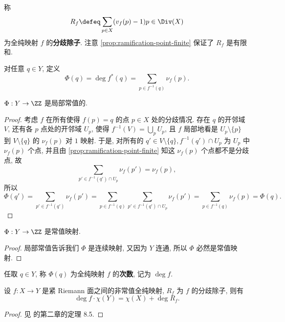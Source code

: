 \begin{exmp}[分歧除子]
\label{exmp:ramification-divisor}
称
\begin{equation}
\label{eq:ramification-divisor}
R_f \defeq \sum_{p \in X}(v_f(p) - 1)p \in \Div(X)
\end{equation}
为全纯映射 $f$ 的\textbf{分歧除子}.
注意 \cref{prop:ramification-point-finite} 保证了 $R_f$ 是有限和.
\end{exmp}

对任意 $q \in Y$, 定义
\[\Phi(q) = \deg f^*(q) = \sum_{p \in f^{-1}(q)}\nu_f(p).\]

\begin{prop}
$\Phi: Y \to \ZZ$ 是局部常值的.
\end{prop}

\begin{proof}
考虑 $f$ 在所有使得 $f(p) = q$ 的点 $p \in X$ 处的分歧情况.
存在 $q$ 的开邻域 $V$, 还有各 $p$ 点处的开邻域 $U_p$,
使得 $f^{-1}(V) = \bigcup_p U_p$,
且 $f$ 局部地看是 $U_p\setminus \{p\}$ 到 $V\setminus \{q\}$ 的 $\nu_f(p)$ 对 $1$ 映射.
于是, 对所有的 $q' \in V\setminus \{q\}, f^{-1}(q') \cap U_p$ 为 $U_p$ 中 $\nu_f(p)$ 个点,
并且由 \cref{prop:ramification-point-finite} 知这 $\nu_f(p)$ 个点都不是分歧点,
故
\[\sum_{p' \in f^{-1}(q') \cap U_p} \nu_f(p') = \nu_f(p),\]
所以
\[\Phi(q') = \sum_{p' \in f^{-1}(q')}\nu_f(p') = \sum_{p \in f^{-1}(q)}\sum_{p' \in f^{-1}(q') \cap U_p} \nu_f(p') = \sum_{p \in f^{-1}(q)}\nu_f(p) = \Phi(q).\]
\end{proof}

\begin{cor}
$\Phi: Y \to \ZZ$ 是常值映射.
\end{cor}

\begin{proof}
局部常值告诉我们 $\Phi$ 是连续映射,
又因为 $Y$ 连通, 所以 $\Phi$ 必然是常值映射.
\end{proof}

\begin{defin}[全纯映射的次数]
\label{defin:mapping-degree}
任取 $q\in Y$, 称 $\Phi(q)$ 为全纯映射 $f$ 的\textbf{次数}, 记为 $\deg f$.
\end{defin}

\begin{prop}
\label{prop:Riemann-Hurwitz-Formula}
设 $f:X \to Y$ 是紧 Riemann 面之间的非常值全纯映射,
$R_f$ 为 $f$ 的分歧除子, 则有
\begin{equation}
\label{eq:Riemann-Hurwitz-Formula}
\deg f\cdot \chi(Y) = \chi(X) + \deg R_f.
\end{equation}
\end{prop}

\begin{proof}
见 \cite{textbook} 的第二章的定理 8.5.
\end{proof}
